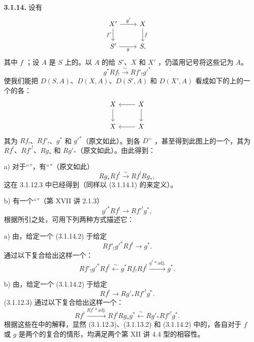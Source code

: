 \textbf{3.1.14.} 设有
\[
\begin{tikzcd}
X'\arrow[r,"g'"]\arrow[d,"f'"']&X\arrow[d,"f"]\\
S'\arrow[r,"g"']&S,
\end{tikzcd}
\]
其中 $f$ ；设 $A$ 是 $S$ 上的。以 $A$ 的给 $S'$、$X$ 和 $X'$ ，仍滥用记号将这些记为 $A$。
\[
 g^*Rf_!\xrightarrow{\sim}Rf'_!g'^*\tag{3.1.14.1}
\]
使我们能把 $D(S,A)$、$D(X,A)$、$D(S',A)$ 和 $D(X',A)$ 看成如下的上的一个的各：
\[
\begin{tikzcd}
X\arrow[d]&X\arrow[l]\arrow[d]\\
X&X\arrow[l]
\end{tikzcd}
\]
其为 $Rf_!$、$Rf'_!$、$g^*$ 和 $g'^*$（原文如此）。到各 $D^+$ ，甚至得到此图上的一个，其为 $Rf^!$、$Rf'^!$、$Rg_*$ 和 $Rg'_*$（原文如此）。由此得到：

a) 对于“”，有“”（原文如此）
\[
 Rg_*Rf^!\xrightarrow{\sim}Rf^!Rg_*,
\]
这在 3.1.12.3 中已经得到（同样以 (3.1.14.1) 的来定义）。

b) 有一个“”（第 XVII 讲 2.1.3）
\[
 g'^*Rf^!\longrightarrow Rf'^!g^*,\tag{3.1.14.2}
\]
根据所引之处，可用下列两种方式描述它：

a) 由，给定一个 (3.1.14.2) 于给定
\[
 Rf'_!g'^*Rf^!\longrightarrow g^*.
\]
通过以下复合给出这样一个：
\[
 Rf'_!g'^*Rf^!\xleftarrow{\sim}g^*Rf_!Rf^!
 \xrightarrow{g^*\ast\mathrm{adj.}}g^*.
\]

b) 由，给定一个 (3.1.14.2) 于给定
\[
 Rf^!\longrightarrow Rg'_*Rf'^!g^*.
\]
 (3.1.12.3) 通过以下复合给出这样一个：
\[
 Rf^!\xrightarrow{Rf^!\ast\mathrm{adj.}}Rf^!Rg_*g^*
 \xleftarrow{\sim}Rg'_*Rf'^!g^*.
\]
根据这些在中的解释，显然 (3.1.12.3)、(3.1.13.2) 和 (3.1.14.2) 中的，各自对于 $f$ 或 $g$ 是两个的复合的情形，均满足两个第 XII 讲 4.4 型的相容性。

